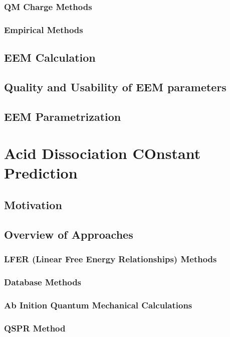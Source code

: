 \subsection{QM Charge Methods}

\subsection{Empirical Methods}

\section{EEM Calculation}

\section{Quality and Usability of EEM parameters}

\section{EEM Parametrization}

\chapter{Acid Dissociation COnstant Prediction}

\section{Motivation}

\section{Overview of Approaches}

\subsection{LFER (Linear Free Energy Relationships) Methods}

\subsection{Database Methods}

\subsection{Ab Inition Quantum Mechanical Calculations}

\subsection{QSPR Method}
